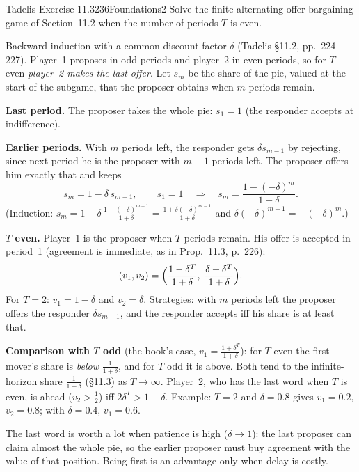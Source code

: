 \begin{exsol}{Tadelis Exercise 11.3}{236}{Foundations}{2}
\asked Solve the finite alternating-offer bargaining game of Section~11.2 when the number of periods $T$ is
even.

\method Backward induction with a common discount factor $\delta$ (Tadelis \S11.2, pp.~224--227).
Player~1 proposes in odd periods and player~2 in even periods, so for $T$ even \emph{player~2 makes the
last offer}. Let $s_m$ be the share of the pie, valued at the start of the subgame, that the proposer
obtains when $m$ periods remain.

\solution
\textbf{Last period.} The proposer takes the whole pie: $s_1 = 1$ (the responder accepts at indifference).

\textbf{Earlier periods.} With $m$ periods left, the responder gets $\delta s_{m-1}$ by rejecting, since next
period he is the proposer with $m-1$ periods left. The proposer offers him exactly that and keeps
\[
  s_m = 1 - \delta\, s_{m-1}, \qquad s_1 = 1 \quad\Longrightarrow\quad
  s_m = \frac{1 - (-\delta)^m}{1 + \delta}.
\]
(Induction: $s_m = 1 - \delta\,\frac{1 - (-\delta)^{m-1}}{1+\delta} = \frac{1 + \delta(-\delta)^{m-1}}{1+\delta}$ and
$\delta(-\delta)^{m-1} = -(-\delta)^m$.)

\textbf{$T$ even.} Player~1 is the proposer when $T$ periods remain. His offer is accepted in period~1
(agreement is immediate, as in Prop.~11.3, p.~226):
\[
  (v_1, v_2) = \Bigl(\frac{1 - \delta^T}{1 + \delta},\; \frac{\delta + \delta^T}{1 + \delta}\Bigr).
\]
For $T = 2$: $v_1 = 1 - \delta$ and $v_2 = \delta$. Strategies: with $m$ periods left the proposer offers the
responder $\delta s_{m-1}$, and the responder accepts iff his share is at least that.

\textbf{Comparison with $T$ odd} (the book's case, $v_1 = \frac{1 + \delta^T}{1 + \delta}$): for $T$ even the first
mover's share is \emph{below} $\frac{1}{1+\delta}$, and for $T$ odd it is above. Both tend to the
infinite-horizon share $\frac{1}{1+\delta}$ (\S11.3) as $T \to \infty$. Player~2, who has the last word when
$T$ is even, is ahead ($v_2 > \frac12$) iff $2\delta^T > 1 - \delta$. Example: $T = 2$ and $\delta = 0.8$ gives
$v_1 = 0.2$, $v_2 = 0.8$; with $\delta = 0.4$, $v_1 = 0.6$.

\interp The last word is worth a lot when patience is high ($\delta \to 1$): the last proposer can claim
almost the whole pie, so the earlier proposer must buy agreement with the value of that position. Being
first is an advantage only when delay is costly.


\end{exsol}
